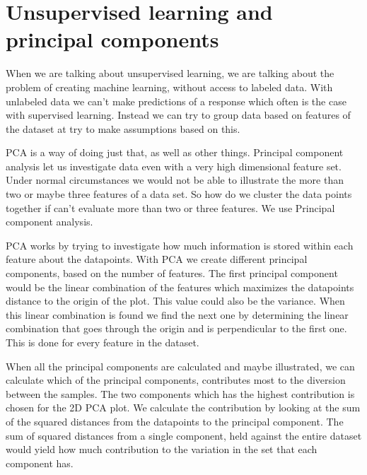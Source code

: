 
\chapter{Unsupervised learning and principal components}

When we are talking about unsupervised learning, we are talking about the problem of creating machine learning, without access to labeled data. With unlabeled data we can’t make predictions of a response which often is the case with supervised learning. Instead we can try to group data based on features of the dataset at try to make assumptions based on this.

PCA is a way of doing just that, as well as other things. Principal component analysis let us investigate data even with a very high dimensional feature set. Under normal circumstances we would not be able to illustrate the more than two or maybe three features of a data set. So how do we cluster the data points together if can’t evaluate more than two or three features. We use Principal component analysis. 

PCA works by trying to investigate how much information is stored within each feature about the datapoints. With PCA we create different principal components, based on the number of features. The first principal component would be the linear combination of the features which maximizes the datapoints distance to the origin of the plot. This value could also be the variance. When this linear combination is found we find the next one by determining the linear combination that goes through the origin and is perpendicular to the first one. This is done for every feature in the dataset.

When all the principal components are calculated and maybe illustrated, we can calculate which of the principal components, contributes most to the diversion between the samples. The two components which has the highest contribution is chosen for the 2D PCA plot. We calculate the contribution by looking at the sum of the squared distances from the datapoints to the principal component. The sum of squared distances from a single component, held against the entire dataset would yield how much contribution to the variation in the set that each component has.

